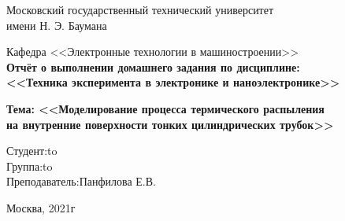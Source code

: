   \begin{titlepage}
\begin{center}
       {\large Московский государственный технический университет\\
       имени Н. Э. Баумана}
    
    {\large Кафедра <<Электронные технологии в машиностроении>>}\\
    \vspace{5cm}
    {\large \textbf{Отчёт о выполнении домашнего задания по дисциплине:\\
    <<Техника эксперимента в электронике и наноэлектронике>>}}\\
    
    \vspace{2cm}
    
    {\large \textbf{Тема: <<Моделирование процесса
    	 термического распыления \\
    	 на внутренние
    	 поверхности тонких 
    	 цилиндрических трубок>>}}
    \end{center}
    \vspace{5cm}
    \newbox{\lbox}
    \newlength{\maxl}
    \setlength{\maxl}{\wd\lbox}
    \hfill\parbox{11cm}
    {
    \hspace*{5cm}\hspace*{-5cm}Студент:\hfill\hbox to\\
    \hspace*{5cm}\hspace*{-5cm}Группа:\hfill\hbox to\\
    \hspace*{5cm}\hspace*{-5cm}Преподаватель:\hfill{Панфилова Е.В.\hfill}\\
    }
    \vfill
    \begin{center}
        Москва, 2021г
    \end{center}
    \end{titlepage}
